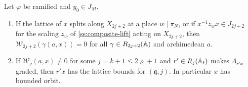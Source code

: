 \begin{theorem}\label{thm:support}
Let $\varphi$ be ramified and $y_0\in J_M$.
\begin{enumerate}[label=\textup{(\alph*)}]
\item If the lattice of $x$ splits along $X_{2j+2}$ at a place $w\mid\pi_N$, or if $x^{-1}z_wx\in J_{2j+2}$ for the scaling $z_w$
of \cref{ss:composite-lift} acting on $X_{2j+2}$, then $\mathcal W_{2j+2}(\gamma(a,x))=0$ for all $\gamma\in R_{2j+2}(\mathbb{A})$ and
archimedean $a$.
\item If $\mathcal W_j(a,x)\ne0$ for some $j=k+1\le2\varrho+1$ and $r'\in R_j(\mathbb{A}_{\mathrm f})$ makes $\Lambda_{r'x}$ graded, then $r'x$ has the
lattice bounds for $(\mathfrak q,j)$. In particular $x$ has bounded orbit.
\end{enumerate}
\end{theorem}


